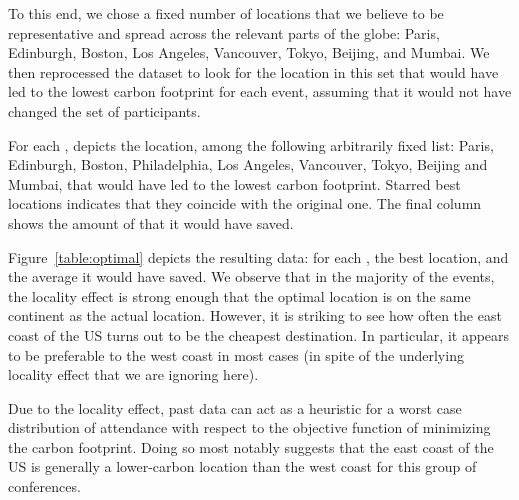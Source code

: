 To this end, we chose a fixed number of locations that we believe to be
representative and spread across the relevant parts of the globe: Paris,
Edinburgh, Boston, Los Angeles, Vancouver, Tokyo, Beijing, and Mumbai. We
then reprocessed the dataset to look for the location in this set that would
have led to the lowest carbon footprint for each event, assuming that it
would not have changed the set of participants.

\begin{table}
    \centering
  \caption{For each \event, depicts the location, among the following arbitrarily fixed list:
    Paris, Edinburgh, Boston, Philadelphia, Los Angeles, Vancouver, Tokyo, Beijing and Mumbai,
    that would have led to the lowest carbon footprint.
    Starred best locations indicates that they coincide with the original one.
    The final column shows the amount
    of \gazunitbis that it would have saved. 
  }
  \label{table:optimal}
\end{table}

Figure~\ref{table:optimal} depicts the resulting data: for each \event, the
best location, and the average \gazunitbis{} it would have saved. We observe
that in the majority of the events, the locality effect is strong enough
that the optimal location is on the same continent as the actual
location. However, it is striking to see how often the east coast of the US
turns out to be the cheapest destination. In particular, it appears to be
preferable to the west coast in most cases (in spite of the underlying
locality effect that we are ignoring here).

\begin{obs}
Due to the locality effect, past data can act as a heuristic for a worst
case distribution of attendance with respect to the objective function of
minimizing the carbon footprint. Doing so most notably suggests that the
east coast of the US is generally a lower-carbon location than the west
coast for this group of conferences.
  \label{obs:optim}
\end{obs}
